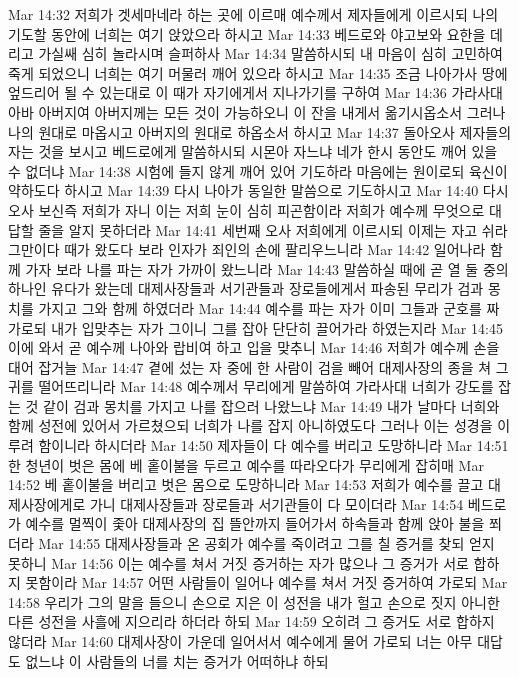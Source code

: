 Mar 14:32  저희가 겟세마네라 하는 곳에 이르매 예수께서 제자들에게 이르시되 나의 기도할 동안에 너희는 여기 앉았으라 하시고
Mar 14:33  베드로와 야고보와 요한을 데리고 가실쌔 심히 놀라시며 슬퍼하사
Mar 14:34  말씀하시되 내 마음이 심히 고민하여 죽게 되었으니 너희는 여기 머물러 깨어 있으라 하시고
Mar 14:35  조금 나아가사 땅에 엎드리어 될 수 있는대로 이 때가 자기에게서 지나가기를 구하여
Mar 14:36  가라사대 아바 아버지여 아버지께는 모든 것이 가능하오니 이 잔을 내게서 옮기시옵소서 그러나 나의 원대로 마옵시고 아버지의 원대로 하옵소서 하시고
Mar 14:37  돌아오사 제자들의 자는 것을 보시고 베드로에게 말씀하시되 시몬아 자느냐 네가 한시 동안도 깨어 있을 수 없더냐
Mar 14:38  시험에 들지 않게 깨어 있어 기도하라 마음에는 원이로되 육신이 약하도다 하시고
Mar 14:39  다시 나아가 동일한 말씀으로 기도하시고
Mar 14:40  다시 오사 보신즉 저희가 자니 이는 저희 눈이 심히 피곤함이라 저희가 예수께 무엇으로 대답할 줄을 알지 못하더라
Mar 14:41  세번째 오사 저희에게 이르시되 이제는 자고 쉬라 그만이다 때가 왔도다 보라 인자가 죄인의 손에 팔리우느니라
Mar 14:42  일어나라 함께 가자 보라 나를 파는 자가 가까이 왔느니라
Mar 14:43  말씀하실 때에 곧 열 둘 중의 하나인 유다가 왔는데 대제사장들과 서기관들과 장로들에게서 파송된 무리가 검과 몽치를 가지고 그와 함께 하였더라
Mar 14:44  예수를 파는 자가 이미 그들과 군호를 짜 가로되 내가 입맞추는 자가 그이니 그를 잡아 단단히 끌어가라 하였는지라
Mar 14:45  이에 와서 곧 예수께 나아와 랍비여 하고 입을 맞추니
Mar 14:46  저희가 예수께 손을 대어 잡거늘
Mar 14:47  곁에 섰는 자 중에 한 사람이 검을 빼어 대제사장의 종을 쳐 그 귀를 떨어뜨리니라
Mar 14:48  예수께서 무리에게 말씀하여 가라사대 너희가 강도를 잡는 것 같이 검과 몽치를 가지고 나를 잡으러 나왔느냐
Mar 14:49  내가 날마다 너희와 함께 성전에 있어서 가르쳤으되 너희가 나를 잡지 아니하였도다 그러나 이는 성경을 이루려 함이니라 하시더라
Mar 14:50  제자들이 다 예수를 버리고 도망하니라
Mar 14:51  한 청년이 벗은 몸에 베 홑이불을 두르고 예수를 따라오다가 무리에게 잡히매
Mar 14:52  베 홑이불을 버리고 벗은 몸으로 도망하니라
Mar 14:53  저희가 예수를 끌고 대제사장에게로 가니 대제사장들과 장로들과 서기관들이 다 모이더라
Mar 14:54  베드로가 예수를 멀찍이 좇아 대제사장의 집 뜰안까지 들어가서 하속들과 함께 앉아 불을 쬐더라
Mar 14:55  대제사장들과 온 공회가 예수를 죽이려고 그를 칠 증거를 찾되 얻지 못하니
Mar 14:56  이는 예수를 쳐서 거짓 증거하는 자가 많으나 그 증거가 서로 합하지 못함이라
Mar 14:57  어떤 사람들이 일어나 예수를 쳐서 거짓 증거하여 가로되
Mar 14:58  우리가 그의 말을 들으니 손으로 지은 이 성전을 내가 헐고 손으로 짓지 아니한 다른 성전을 사흘에 지으리라 하더라 하되
Mar 14:59  오히려 그 증거도 서로 합하지 않더라
Mar 14:60  대제사장이 가운데 일어서서 예수에게 물어 가로되 너는 아무 대답도 없느냐 이 사람들의 너를 치는 증거가 어떠하냐 하되
